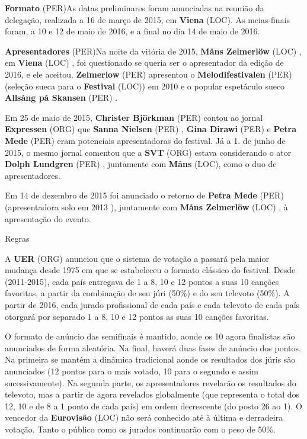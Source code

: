 \documentclass[12pt,a4paper]{article}
\begin{document}
\textbf{Formato} (PER)As datas preliminares foram anunciadas na reunião da delegação, realizada a 16 de março de 2015, em \textbf{Viena} (LOC). As meias-finais foram, a 10 e 12 de maio de 2016, e a final no dia 14 de maio de 2016.



\textbf{Apresentadores} (PER)Na noite da vitória de 2015, \textbf{Måns Zelmerlöw} (LOC) , em \textbf{Viena} (LOC) , foi questionado se queria ser o apresentador da edição de 2016, e ele aceitou. \textbf{Zelmerlow} (PER) apresentou o \textbf{Melodifestivalen} (PER) (seleção sueca para o \textbf{Festival} (LOC)) em 2010 e o popular espetáculo sueco \textbf{Allsång på Skansen} (PER) .

Em 25 de maio de 2015, \textbf{Christer Björkman} (PER) contou ao jornal \textbf{Expressen} (ORG) que \textbf{Sanna Nielsen} (PER) , \textbf{Gina Dirawi} (PER) e \textbf{Petra Mede} (PER) eram potenciais apresentadoras do festival. Já a 1. de junho de 2015, o mesmo jornal comentou que a \textbf{SVT} (ORG) estava considerando o ator \textbf{Dolph Lundgren} (PER) , juntamente com \textbf{Måns} (LOC), como o duo de apresentadores.

Em 14 de dezembro de 2015 foi anunciado o retorno de \textbf{Petra Mede} (PER) (apresentadora solo em 2013 ), juntamente com \textbf{Måns Zelmerlöw} (LOC) , à apresentação do evento.



Regras

A \textbf{UER} (ORG) anunciou que o sistema de votação a passará pela maior mudança desde 1975 em que se estabeleceu o formato clássico do festival. Desde (2011-2015), cada país entregava de 1 a 8, 10 e 12 pontos a suas 10 canções favoritas, a partir da combinação de seu júri (50\%) e do seu televoto (50\%). A partir de 2016, cada jurado profissional de cada país e cada televoto de cada país otorgará por separado 1 a 8, 10 e 12 pontos as suas 10 canções favoritas.

O formato de anúncio das semifinais é mantido, aonde os 10 agora finalistas são anunciados de forma aleatória. Na final, haverá duas fases de anúncio dos pontos. Na primeira se mantém a dinâmica tradicional aonde os resultados dos júris são anunciados (12 pontos para o mais votado, 10 para o segundo e assim sucessivamente). Na segunda parte, os apresentadores revelarão os resultados do televoto, mas a partir de agora revelados globalmente (que representa o total dos 12, 10 e de 8 a 1 ponto de cada país) em ordem decrescente (do posto 26 ao 1). O vencedor da \textbf{Eurovisão} (LOC) não será conhecido até à última e derradeira votação. Tanto o público como os jurados continuarão com o peso de 50\%.
\end{document}

